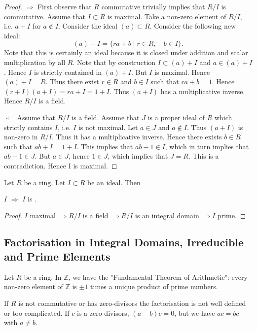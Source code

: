 \documentclass{article}
\begin{document}
\begin{proof}
$\Rightarrow$ First observe that $R$ commutative trivially implies that $R / I$ is commutative.
Assume that $I \subset R$ is maximal. Take a non-zero element of $R / I$, i.e. $a+I$ for $a \notin I$. Consider the ideal $(a) \subset R$. Consider the following new ideal:
$$
(a)+I=\{r a+b \mid r \in R, \quad b \in I\} .
$$
Note that this is certainly an ideal because it is closed under addition and scalar multiplication by all $R$. Note that by construction $I \subset(a)+I$ and $a \in(a)+I$. Hence $I$ is strictly contained in $(a)+I$. But $I$ is maximal. Hence $(a)+I=R$. Thus there exist $r \in R$ and $b \in I$ such that $r a+b=1$. Hence $(r+I)(a+I)=r a+I=1+I$. Thus $(a+I)$ has a multiplicative inverse. Hence $R / I$ is a field.

$\Leftarrow$ Assume that $R / I$ is a field. Assume that $J$ is a proper ideal of $R$ which strictly contains $I$, i.e. $I$ is not maximal. Let $a \in J$ and $a \notin I$. Thus $(a+I)$ is non-zero in $R / I$. Thus it has a multiplicative inverse. Hence there exists $b \in R$ such that $a b+I=1+I$. This implies that $a b-1 \in I$, which in turn implies that $a b-1 \in J$. But $a \in J$, hence $1 \in J$, which implies that $J=R$. This is a contradiction. Hence I is maximal.
\end{proof} 


\begin{cora}\label{cor:omadnmnee}
Let $R$ be a  ring. Let $I \subset R$ be an ideal. Then 

\centerline{$I$  $\Rightarrow$ $I$ is .}
\end{cora}
\begin{proof}
$I$ maximal $\Rightarrow R / I$ is a field $\Rightarrow R / I$ is an integral domain $\Rightarrow I$ prime.
\end{proof} 

\subsection{Factorisation in Integral Domains, Irreducible and Prime Elements}\label{sec:facid}

Let $R$ be a ring. In $\mathbb{Z}$, we have the "Fundamental Theorem of Arithmetic": every non-zero element of $\mathbb{Z}$ is $\pm 1$ times a unique product of prime numbers. 

If $R$ is not commutative or has zero-divisors the factorisation is not well defined or too complicated. If $c$ is a zero-divisors, $(a-b)c=0$, but we have $ac=bc$ with $a\ne b$.
\end{document}
